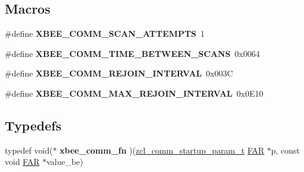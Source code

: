\subsection*{Macros}
\begin{DoxyCompactItemize}
\item 
\hypertarget{group__xbee__commissioning_ga23d98ae5f8500da3bfa56812d5fcf568}{\#define {\bfseries X\-B\-E\-E\-\_\-\-C\-O\-M\-M\-\_\-\-S\-C\-A\-N\-\_\-\-A\-T\-T\-E\-M\-P\-T\-S}~1}\label{group__xbee__commissioning_ga23d98ae5f8500da3bfa56812d5fcf568}

\item 
\hypertarget{group__xbee__commissioning_gaf8d4e57bf93de8024ae827ddd8a5e9d2}{\#define {\bfseries X\-B\-E\-E\-\_\-\-C\-O\-M\-M\-\_\-\-T\-I\-M\-E\-\_\-\-B\-E\-T\-W\-E\-E\-N\-\_\-\-S\-C\-A\-N\-S}~0x0064}\label{group__xbee__commissioning_gaf8d4e57bf93de8024ae827ddd8a5e9d2}

\item 
\hypertarget{group__xbee__commissioning_gafe13908815f7385ccfb912c0b5aca770}{\#define {\bfseries X\-B\-E\-E\-\_\-\-C\-O\-M\-M\-\_\-\-R\-E\-J\-O\-I\-N\-\_\-\-I\-N\-T\-E\-R\-V\-A\-L}~0x003\-C}\label{group__xbee__commissioning_gafe13908815f7385ccfb912c0b5aca770}

\item 
\hypertarget{group__xbee__commissioning_gabae5f132ed1e863cd313c12b4c5ce3a3}{\#define {\bfseries X\-B\-E\-E\-\_\-\-C\-O\-M\-M\-\_\-\-M\-A\-X\-\_\-\-R\-E\-J\-O\-I\-N\-\_\-\-I\-N\-T\-E\-R\-V\-A\-L}~0x0\-E10}\label{group__xbee__commissioning_gabae5f132ed1e863cd313c12b4c5ce3a3}

\end{DoxyCompactItemize}
\subsection*{Typedefs}
\begin{DoxyCompactItemize}
\item 
\hypertarget{group__xbee__commissioning_ga058bf8d748fd13105e0daed46699412c}{typedef void($\ast$ {\bfseries xbee\-\_\-comm\-\_\-fn} )(\hyperlink{structzcl__comm__startup__param__t}{zcl\-\_\-comm\-\_\-startup\-\_\-param\-\_\-t} \hyperlink{group__hal_gaef060b3456fdcc093a7210a762d5f2ed}{F\-A\-R} $\ast$p, const void \hyperlink{group__hal_gaef060b3456fdcc093a7210a762d5f2ed}{F\-A\-R} $\ast$value\-\_\-be)}\label{group__xbee__commissioning_ga058bf8d748fd13105e0daed46699412c}

\end{DoxyCompactItemize}
